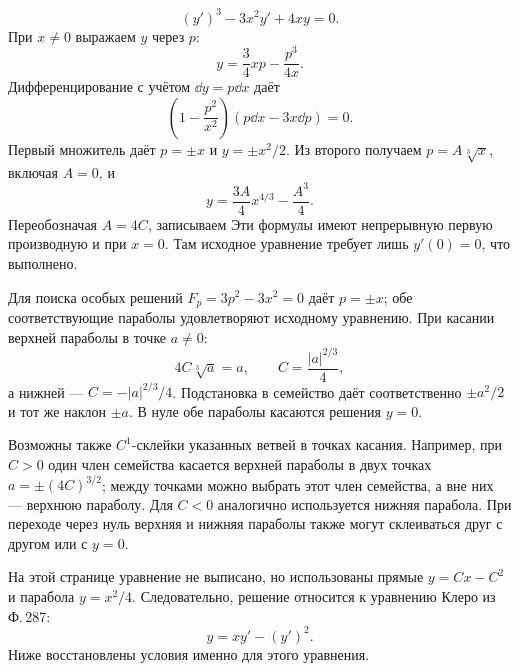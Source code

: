 \[
 (y')^3-3x^2y'+4xy=0.
\]
При $x\ne0$ выражаем $y$ через $p$:
\[
 y=\frac34xp-\frac{p^3}{4x}.
\]
Дифференцирование с учётом $\dd y=p\dd x$ даёт
\[
 \left(1-\frac{p^2}{x^2}\right)(p\dd x-3x\dd p)=0.
\]
Первый множитель даёт $p=\pm x$ и $y=\pm x^2/2$.
Из второго получаем $p=A\sqrt[3]x$, включая $A=0$, и
\[
 y=\frac{3A}4x^{4/3}-\frac{A^3}4.
\]
Переобозначая $A=4C$, записываем
Эти формулы имеют непрерывную первую производную и при $x=0$.
Там исходное уравнение требует лишь $y'(0)=0$, что выполнено.

Для поиска особых решений $F_p=3p^2-3x^2=0$ даёт $p=\pm x$;
обе соответствующие параболы удовлетворяют исходному уравнению.
При касании верхней параболы в точке $a\ne0$:
\[
 4C\sqrt[3]a=a,\qquad C=\frac{|a|^{2/3}}4,
\]
а нижней --- $C=-|a|^{2/3}/4$. Подстановка в семейство даёт
соответственно $\pm a^2/2$ и тот же наклон $\pm a$.
В нуле обе параболы касаются решения $y=0$.

Возможны также $C^1$-склейки указанных ветвей в точках касания.
Например, при $C>0$ один член семейства касается верхней параболы
в двух точках $a=\pm(4C)^{3/2}$; между точками можно выбрать этот
член семейства, а вне них --- верхнюю параболу.
Для $C<0$ аналогично используется нижняя парабола.
При переходе через нуль верхняя и нижняя параболы также могут
склеиваться друг с другом или с $y=0$.

\begin{center}
\end{center}

На этой странице уравнение не выписано, но использованы прямые
$y=Cx-C^2$ и парабола $y=x^2/4$. Следовательно, решение относится к
уравнению Клеро из Ф.\,287:
\[
 y=xy'-(y')^2.
\]
Ниже восстановлены условия именно для этого уравнения.

